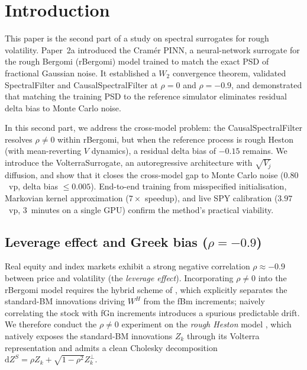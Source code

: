 \documentclass[11pt,a4paper]{article}
\begin{document}
\section{Introduction}
\label{sec:intro}

This paper is the second part of a study on spectral surrogates for
rough volatility. Paper~2a \citep{TODO-paper2a} introduced the
Cramér PINN, a neural-network surrogate for the rough Bergomi (rBergomi)
model trained to match the exact PSD of fractional Gaussian noise.
It established a $W_2$ convergence theorem, validated SpectralFilter and
CausalSpectralFilter at $\rho=0$ and $\rho=-0.9$, and demonstrated
that matching the training PSD to the reference simulator eliminates
residual delta bias to Monte Carlo noise.

In this second part, we address the cross-model problem: the CausalSpectralFilter
resolves $\rho\neq 0$ within rBergomi, but when the reference process is
rough Heston (with mean-reverting $V$ dynamics), a residual delta bias of
$-0.15$ remains. We introduce the VolterraSurrogate, an autoregressive
architecture with $\sqrt{V_j}$ diffusion, and show that it closes the
cross-model gap to Monte Carlo noise ($0.80$~vp, delta bias $\leq 0.005$).
End-to-end training from misspecified initialisation, Markovian kernel
approximation ($7\times$ speedup), and live SPY calibration ($3.97$~vp,
$3$~minutes on a single GPU) confirm the method's practical viability.

\tableofcontents
\newpage
\subsection{Leverage effect and Greek bias ($\rho = -0.9$)}
\label{sec:greeks}

Real equity and index markets exhibit a strong negative correlation
$\rho \approx -0.9$ between price and volatility (the \emph{leverage
effect}). Incorporating $\rho \neq 0$ into the rBergomi model requires
the hybrid scheme of \citet{bennedsen2017hybrid}, which explicitly
separates the standard-BM innovations driving $W^H$ from the fBm
increments; naively correlating the stock with fGn increments introduces
a spurious predictable drift. We therefore conduct the $\rho \neq 0$
experiment on the \emph{rough Heston} model
\citep{ElEuch2019,el2019perfect}, which natively exposes the standard-BM
innovations $Z_k$ through its Volterra representation and admits a clean
Cholesky decomposition $\mathrm{d}Z^S = \rho Z_k + \sqrt{1-\rho^2}
Z_k^\perp$.
\end{document}

